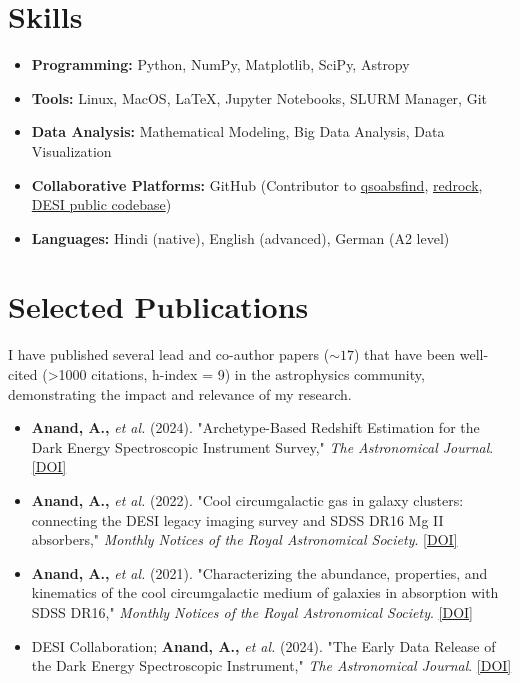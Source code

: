\documentclass[a4paper,10pt]{article}
\begin{document}
\section*{Skills}
\begin{itemize}[noitemsep, topsep=0pt]
    \item \textbf{Programming:} Python, NumPy, Matplotlib, SciPy, Astropy
    \item \textbf{Tools:} Linux, MacOS, LaTeX, Jupyter Notebooks, SLURM Manager, Git
    \item \textbf{Data Analysis:} Mathematical Modeling, Big Data Analysis, Data Visualization
    \item \textbf{Collaborative Platforms:} GitHub (Contributor to \href{https://github.com/abhi0395/qsoabsfind}{qsoabsfind}, \href{https://github.com/desihub/redrock}{redrock}, \href{https://github.com/desihub}{DESI public codebase})
     \item \textbf{Languages:} Hindi (native), English (advanced), German (A2 level)
\end{itemize}


\section*{Selected Publications}
I have published several lead and co-author papers ($\sim 17$) that have been well-cited (>1000 citations, h-index = 9) in the astrophysics community, demonstrating the impact and relevance of my research.
\begin{itemize}[noitemsep, topsep=0pt]
    \item \textbf{Anand, A.,} \textit{et al.} (2024). "Archetype-Based Redshift Estimation for the Dark Energy Spectroscopic Instrument Survey," \textit{The Astronomical Journal}. \href{https://iopscience.iop.org/article/10.3847/1538-3881/ad60c2}{[DOI]}
    \item \textbf{Anand, A.,} \textit{et al.} (2022). "Cool circumgalactic gas in galaxy clusters: connecting the DESI legacy imaging survey and SDSS DR16 Mg II absorbers," \textit{Monthly Notices of the Royal Astronomical Society}. \href{https://doi.org/10.1093/mnras/stab871}{[DOI]}
    \item \textbf{Anand, A.,} \textit{et al.} (2021). "Characterizing the abundance, properties, and kinematics of the cool circumgalactic medium of galaxies in absorption with SDSS DR16," \textit{Monthly Notices of the Royal Astronomical Society}. \href{https://doi.org/10.1093/mnras/stac928}{[DOI]}
    \item DESI Collaboration; \textbf{Anand, A.,} \textit{et al.} (2024). "The Early Data Release of the Dark Energy Spectroscopic Instrument," \textit{The Astronomical Journal}. \href{https://doi.org/10.3847/1538-3881/ad3217}{[DOI]}
\end{itemize}
\end{document}
